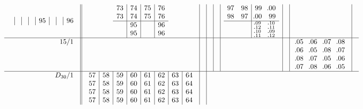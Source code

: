 \documentclass[12pt,a4paper]{amsart}
\begin{document}
\begin{align*}
\begin{array}{r||c|c|c|c|c|c|c|c}
\begin{array}{c|c|c|c|c|c|c|c}
  &  &  &  &95&  &  &96\\
      \end{array}
&
  \begin{array}{c|c|c|c}
73&74&75&76\\
73&74&75&76\\ \hline
  &95&  &96\\
  &95&  &96\\
  \end{array}
&&&&
     \begin{array}{cc|cc}
97&98&99&\llap{.}00\\
98&97&\llap{.}00&99\\ \hline
  &  &^{\llap{.}09}_{\llap{.}12}&^{\llap{.}10}_{\llap{.}11}\\
  &  &^{\llap{.}10}_{\llap{.}11}&^{\llap{.}09}_{\llap{.}12}\\
     \end{array}
&& \\ \hline
    \begin{array}{r}
15/1 \\ \\ \\ \\
    \end{array}
    &&&&&&&
            \begin{array}{cccc}
\llap{.}05&\llap{.}06&\llap{.}07&\llap{.}08\\
\llap{.}06&\llap{.}05&\llap{.}08&\llap{.}07\\
\llap{.}08&\llap{.}07&\llap{.}05&\llap{.}06\\
\llap{.}07&\llap{.}08&\llap{.}06&\llap{.}05\\
            \end{array}
& \\ \hline
    \begin{array}{r}
D_{30}/1 \\ \\ \\ \\
    \end{array}
    &
      \begin{array}{c|c|c|c|c|c|c|c}
57&58&59&60&61&62&63&64\\
57&58&59&60&61&62&63&64\\
57&58&59&60&61&62&63&64\\
57&58&59&60&61&62&63&64\\
      \end{array}
&
      \begin{array}{c|c|c|c}

\end{array}
\end{array}
\end{align*}
\end{document}
